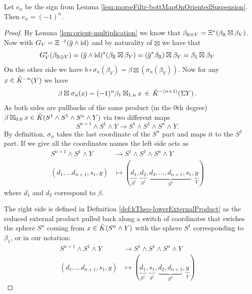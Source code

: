 \begin{remark} \label{rem:morseFilt-calculationOfe}
 Let $e_n$ be the sign from Lemma \ref{lem:morseFiltr-bottMapOnOrientedSuspension}. Then $e_n=(-1)^n$.
\end{remark}
\begin{proof}
	By Lemma \ref{lem:orient-multiplication} we know that $\beta_{\mathbb{R}\oplus V}=\Xi^*(\beta_{\mathbb{R}}\boxtimes \beta_V)$. Now with $G_V=\Xi^{-1}(\overline{g}\wedge \operatorname{\mathrm{id}})$ and by naturality of $\boxtimes$ we have that
	\begin{equation*}
		G^*_V(\beta_{\mathbb{R}\oplus V})=(\overline{g}\wedge \operatorname{\mathrm{id}})^*(\beta_{\mathbb{R}}\boxtimes \beta_V)=(\overline{g}^*\beta_{\mathbb{R}})\boxtimes \beta_V =\beta_1\boxtimes \beta_V
	\end{equation*}
	On the other side we have $b \circ \sigma_n(\beta_V)=\beta \boxtimes (\sigma_n(\beta_V))$. Now for any $x\in \tilde{K}^{-n}(Y)$ we have
	\begin{equation*}
		\beta \boxtimes \sigma_n(x)=(-1)^n\beta_1 \boxtimes_{1,n} x \,\in\, \tilde{K}^{-(n+1)}(\Sigma Y)\,.
	\end{equation*}  As both sides are pullbacks of the same product (in the 0th degree) $\beta\boxtimes_{0,0} x\in \tilde{K}(S^1\wedge S^1\wedge S^n\wedge Y)$ via two different maps
	\begin{equation*}
		S^{n+1}\wedge S^1\wedge Y \to S^1\wedge S^1\wedge S^n\wedge Y.
	\end{equation*} By definition, $\sigma_n$ takes the last coordinate of the $S^n$ part and maps it to the $S^1$ part. If we give all the coordinates names the left side acts as
	\begin{align*}
		S^{n+1}\wedge S^1\wedge Y &\to S^1\wedge S^1\wedge S^n\wedge Y \\
		(d_1,\dots d_{n+1},s_1,y)&\mapsto(\underbrace{d_1}_{S^1},\underbrace{d_2}_{S^1},\underbrace{d_3,\dots,d_{n+1},s_1}_{S^{n}},\underbrace{y}_{Y})
	\end{align*} where $d_1$ and $d_2$ correspond to $\beta$. 
	
	The right side is defined in Definition \ref{def:kTheo-lowerExternalProduct} as the reduced external product pulled back along a switch of coordinates that swiches the sphere $S^n$ coming from $x\in \tilde{K}(S^n\wedge Y)$ with the sphere $S^1$ corresponding to $\beta_1$, or in our notation:
		\begin{align*}
		S^{n+1}\wedge S^1\wedge Y &\to S^1\wedge S^1\wedge S^n\wedge Y \\
		(d_1,\dots d_{n+1},s_1,y)&\mapsto (\underbrace{d_1}_{S^1},\underbrace{s_1}_{S^1},\underbrace{d_2,d_{n+1}}_{S^n},\underbrace{y}_{Y})
	\end{align*}


\end{proof}
